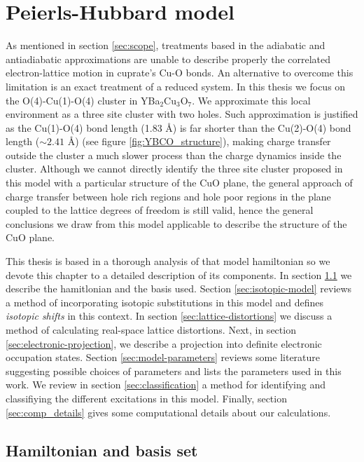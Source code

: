 \chapter{Peierls-Hubbard model}
\label{chap:model}

As mentioned in section \ref{sec:scope}, treatments based in the adiabatic and antiadiabatic approximations are unable to describe properly the correlated electron-lattice motion in cuprate's Cu-O bonds.
An alternative to overcome this limitation is an exact treatment of a reduced system.
In this thesis we focus on the O(4)-Cu(1)-O(4) cluster in YBa$_2$Cu$_3$O$_7$.
We approximate this local environment as a three site cluster with two holes. 
Such approximation is justified as the Cu(1)-O(4) bond length (1.83 \AA) is far shorter than the Cu(2)-O(4) bond length ($\sim 2.41$ \AA) (see figure \ref{fig:YBCO_structure}), making charge transfer outside the cluster a much slower process than the charge dynamics inside the cluster. 
Although we cannot directly identify the three site cluster proposed in this model with a particular structure of the CuO plane, the general approach of charge transfer between hole rich regions and hole poor regions in the plane coupled to the lattice degrees of freedom is still valid, hence the general conclusions we draw from this model applicable to describe the structure of the CuO plane.

This thesis is based in a thorough analysis of that model hamiltonian so we devote this chapter to a detailed description of its components.
In section \ref{sec:hamiltonian-and-basis} we describe the hamitlonian and the basis used. 
Section \ref{sec:isotopic-model} reviews a method of incorporating isotopic substitutions in this model and defines \textit{isotopic shifts} in this context.
In section \ref{sec:lattice-distortions} we discuss a method of calculating real-space lattice distortions.
Next, in section \ref{sec:electronic-projection}, we describe a projection into definite electronic occupation states.
Section \ref{sec:model-parameters} reviews some literature suggesting possible choices of parameters and lists the parameters used in this work.
We review in section \ref{sec:classification} a method for identifying and classifiying the different excitations in this model.
Finally, section \ref{sec:comp_details} gives some computational details about our calculations.

\section{Hamiltonian and basis set}
\label{sec:hamiltonian-and-basis}


